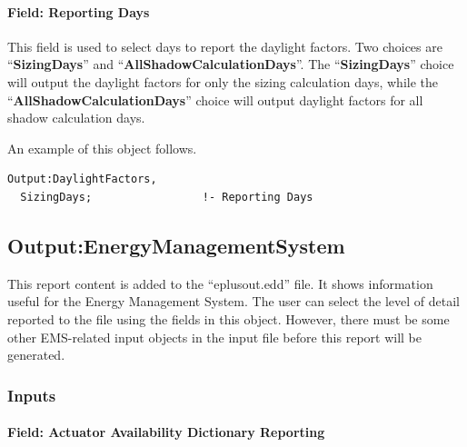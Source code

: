 \paragraph{Field: Reporting Days}\label{field-reporting-days}

This field is used to select days to report the daylight factors. Two choices are ``\textbf{SizingDays}'' and ``\textbf{AllShadowCalculationDays}''. The ``\textbf{SizingDays}'' choice will output the daylight factors for only the sizing calculation days, while the ``\textbf{AllShadowCalculationDays}'' choice will output daylight factors for all shadow calculation days.

An example of this object follows.

\begin{lstlisting}
Output:DaylightFactors,
  SizingDays;                 !- Reporting Days
\end{lstlisting}

\subsection{Output:EnergyManagementSystem}\label{outputenergymanagementsystem}

This report content is added to the ``eplusout.edd'' file. It shows information useful for the Energy Management System. The user can select the level of detail reported to the file using the fields in this object. However, there must be some other EMS-related input objects in the input file before this report will be generated.

\subsubsection{Inputs}\label{inputs-5-024}

\paragraph{Field: Actuator Availability Dictionary Reporting}\label{field-actuator-availability-dictionary-reporting}

